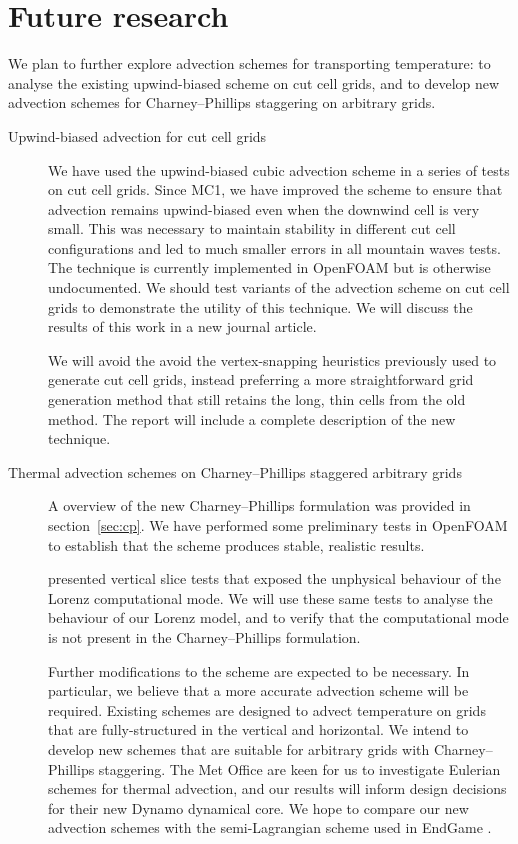 \documentclass[a4paper]{article}
\begin{document}
\section{Future research}
We plan to further explore advection schemes for transporting temperature: to analyse the existing upwind-biased scheme on cut cell grids, and to develop new advection schemes for Charney--Phillips staggering on arbitrary grids.

\begin{description}
	\item[Upwind-biased advection for cut cell grids]{We have used the upwind-biased cubic advection scheme in a series of tests on cut cell grids.  Since MC1, we have improved the scheme to ensure that advection remains upwind-biased even when the downwind cell is very small.  This was necessary to maintain stability in different cut cell configurations and led to much smaller errors in all mountain waves tests.  The technique is currently implemented in OpenFOAM but is otherwise undocumented.  We should test variants of the advection scheme on cut cell grids to demonstrate the utility of this technique.  We will discuss the results of this work in a new journal article.
		
We will avoid the avoid the vertex-snapping heuristics previously used to generate cut cell grids, instead preferring a more straightforward grid generation method that still retains the long, thin cells from the old method.  The report will include a complete description of the new technique.}

\item[Thermal advection schemes on Charney--Phillips staggered arbitrary grids]{A overview of the new Charney--Phillips formulation was provided in section~\ref{sec:cp}.  We have performed some preliminary tests in OpenFOAM to establish that the scheme produces stable, realistic results.
		
\cite{arakawa-konor1996} presented vertical slice tests that exposed the unphysical behaviour of the Lorenz computational mode.  We will use these same tests to analyse the behaviour of our Lorenz model, and to verify that the computational mode is not present in the Charney--Phillips formulation.
		
Further modifications to the scheme are expected to be necessary.  In particular, we believe that a more accurate advection scheme will be required.
Existing schemes are designed to advect temperature on grids that are fully-structured in the vertical and horizontal.  We intend to develop new schemes that are suitable for arbitrary grids with Charney--Phillips staggering.
The Met Office are keen for us to investigate Eulerian schemes for thermal advection, and our results will inform design decisions for their new Dynamo dynamical core.  We hope to compare our new advection schemes with the semi-Lagrangian scheme used in EndGame \citep{davies2005}.}
\end{description}
\end{document}
